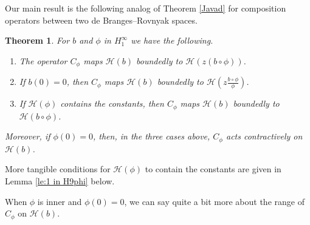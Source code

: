 \documentclass[11pt]{amsart}
\def\HH{{\mathcal H}}
\renewcommand{\subset}{\subseteq}
\numberwithin{equation}{section}
\theoremstyle{plain}
\newtheorem{theorem}[equation]{Theorem}
\theoremstyle{definition}
\begin{document}
Our main result is the following analog of Theorem \ref{Javad} for composition operators between two de Branges--Rovnyak spaces. 

\begin{theorem}\label{MainT}
For $b$ and $\phi$ in $H^{\infty}_{1}$ we have the following.
\begin{enumerate}
\item The operator 
$C_{\phi}$ maps $\HH(b)$ boundedly to $ \HH(z (b \circ \phi))$.
\item If $b(0) = 0$, then $C_{\phi}$ maps $\HH(b)$ boundedly to $\HH(z \frac{b \circ \phi}{\phi})$.
\item If $\HH(\phi)$ contains the constants, then $C_{\phi}$ maps $\HH(b)$ boundedly to $\HH(b \circ \phi)$. 
\end{enumerate}
Moreover,  if $\phi(0) = 0$, then, in the three cases above, $C_{\phi}$ acts contractively on $\HH(b)$.
\end{theorem}

More tangible conditions for $\HH(\phi)$ to contain the constants are given in Lemma \ref{le:1 in H9phi} below. 


When $\phi$ is inner and $\phi(0)=0$, we can say quite a bit more about the range of $C_{\phi}$ on $\HH(b)$.  
\end{document}
